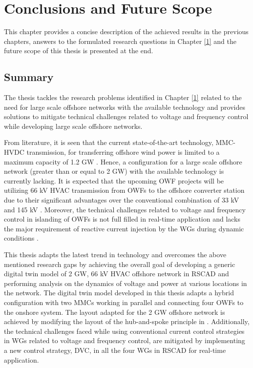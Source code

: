 \chapter{Conclusions and Future Scope}\label{6}

This chapter provides a concise description of the achieved results in the previous chapters, answers to the formulated research questions in Chapter \ref{1} and the future scope of this thesis is presented at the end.

\section{Summary}
The thesis tackles the research problems identified in Chapter \ref{1} related to the need for large scale offshore networks with the available technology and provides solutions to mitigate technical challenges related to voltage and frequency control while developing large scale offshore networks.

From literature, it is seen that the current state-of-the-art technology, \gls{MMC}-\gls{HVDC} transmission, for transferring offshore wind power is limited to a maximum capacity of 1.2 GW \cite{peralta2012detailed}. Hence, a configuration for a large scale offshore network (greater than or equal to 2 GW) with the available technology is currently lacking. It is expected that the upcoming \gls{OWF} projects will be utilizing 66 kV \gls{HVAC} transmission from \gls{OWF}s to the offshore converter station due to their significant advantages over the conventional combination of 33 kV and 145 kV \cite{dnv66kv}. Moreover, the technical challenges related to voltage and frequency control in islanding of \gls{OWF}s is not full filled in real-time application and lacks the major requirement of reactive current injection by the \gls{WG}s during dynamic conditions \cite{sethi_real-time_nodate-new}.

This thesis adapts the latest trend in technology and overcomes the above mentioned research gaps by achieving the overall goal of developing a generic digital twin model of 2 GW, 66 kV \gls{HVAC} offshore network in RSCAD and performing analysis on the dynamics of voltage and power at various locations in the network. The digital twin model developed in this thesis adapts a hybrid configuration with two \gls{MMC}s working in parallel and connecting four \gls{OWF}s to the onshore system. The layout adapted for the 2 GW offshore network is achieved by modifying the layout of the hub-and-spoke principle in \cite{abb_hvdc_2018}. Additionally, the technical challenges faced while using conventional current control strategies in \gls{WG}s related to voltage and frequency control, are mitigated by implementing a new control strategy, \gls{DVC}, in all the four \gls{WG}s in RSCAD for real-time application. 

